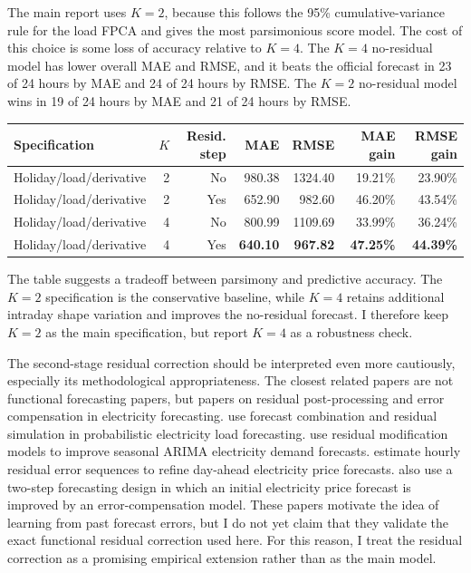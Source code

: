 \documentclass[10pt,a4paper]{article}
\begin{document}
The main report uses \(K=2\), because this follows the 95\% cumulative-variance rule
for the load FPCA and gives the most parsimonious score model. The cost of this
choice is some loss of accuracy relative to \(K=4\). The \(K=4\) no-residual model
has lower overall MAE and RMSE, and it beats the official forecast in 23 of 24 hours
by MAE and 24 of 24 hours by RMSE. The \(K=2\) no-residual model wins in 19 of 24
hours by MAE and 21 of 24 hours by RMSE.

\begin{center}
\fontsize{7.6}{8.8}\selectfont
\begin{tabular}{p{}rrrrrr}
\hline
Specification & \(K\) & Resid. step & MAE & RMSE & MAE gain & RMSE gain\\
\hline
Holiday/load/derivative & 2 & No & 980.38 & 1324.40 & 19.21\% & 23.90\%\\
Holiday/load/derivative & 2 & Yes & 652.90 & 982.60 & 46.20\% & 43.54\%\\
Holiday/load/derivative & 4 & No & 800.99 & 1109.69 & 33.99\% & 36.24\%\\
Holiday/load/derivative & 4 & Yes & {\bf 640.10} & {\bf 967.82} & {\bf 47.25\%} & {\bf 44.39\%}\\
\hline
\end{tabular}
\end{center}

\fontsize{9.2}{10.8}\selectfont

The table suggests a tradeoff between parsimony and predictive accuracy.
The \(K=2\) specification is the conservative baseline, while \(K=4\) retains
additional intraday shape variation and improves the no-residual forecast.
I therefore keep \(K=2\) as the main specification, but report \(K=4\) as a robustness check.

The second-stage residual correction should be interpreted even more cautiously, especially its methodological appropriateness.
The closest related papers are not functional forecasting papers,
but papers on residual post-processing and error compensation in electricity forecasting.
\citet{xie_hong_2016} use forecast combination and residual simulation in probabilistic electricity load forecasting.
\citet{wang_etal_2012} use residual modification models to improve seasonal ARIMA electricity demand forecasts.
\citet{kontogiannis_etal_2022} estimate hourly residual error sequences to refine day-ahead electricity price forecasts.
\citet{ghimire_etal_2024} also use a two-step forecasting design in which an initial electricity price forecast is improved by an error-compensation model.
These papers motivate the idea of learning from past forecast errors, but I do not yet claim that they validate the exact functional residual correction used here.
For this reason, I treat the residual correction as a promising empirical extension rather than as the main model.
\end{document}
